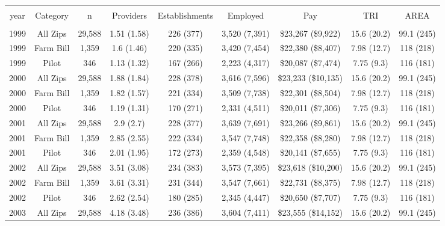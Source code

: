 
\begin{table}[!htbp] \centering 
  \caption{} 
  \label{} 
\begin{tabular}{@{\extracolsep{5pt}} ccccccccc} 
\\[-1.8ex]\hline 
\hline \\[-1.8ex] 
year & Category & n & Providers & Establishments & Employed & Pay & TRI & AREA \\ 
\hline \\[-1.8ex] 
1999 & All Zips & 29,588 & 1.51 (1.58) & 226 (377) & 3,520 (7,391) & \$23,267 (\$9,922) & 15.6 (20.2) & 99.1 (245) \\ 
1999 & Farm Bill & 1,359 & 1.6 (1.46) & 220 (335) & 3,420 (7,454) & \$22,380 (\$8,407) & 7.98 (12.7) & 118 (218) \\ 
1999 & Pilot & 346 & 1.13 (1.32) & 167 (266) & 2,223 (4,317) & \$20,087 (\$7,474) & 7.75 (9.3) & 116 (181) \\ 
2000 & All Zips & 29,588 & 1.88 (1.84) & 228 (378) & 3,616 (7,596) & \$23,233 (\$10,135) & 15.6 (20.2) & 99.1 (245) \\ 
2000 & Farm Bill & 1,359 & 1.82 (1.57) & 221 (334) & 3,509 (7,738) & \$22,301 (\$8,504) & 7.98 (12.7) & 118 (218) \\ 
2000 & Pilot & 346 & 1.19 (1.31) & 170 (271) & 2,331 (4,511) & \$20,011 (\$7,306) & 7.75 (9.3) & 116 (181) \\ 
2001 & All Zips & 29,588 & 2.9 (2.7) & 228 (377) & 3,639 (7,691) & \$23,266 (\$9,861) & 15.6 (20.2) & 99.1 (245) \\ 
2001 & Farm Bill & 1,359 & 2.85 (2.55) & 222 (334) & 3,547 (7,748) & \$22,358 (\$8,280) & 7.98 (12.7) & 118 (218) \\ 
2001 & Pilot & 346 & 2.01 (1.95) & 172 (273) & 2,359 (4,548) & \$20,141 (\$7,655) & 7.75 (9.3) & 116 (181) \\ 
2002 & All Zips & 29,588 & 3.51 (3.08) & 234 (383) & 3,573 (7,395) & \$23,618 (\$10,200) & 15.6 (20.2) & 99.1 (245) \\ 
2002 & Farm Bill & 1,359 & 3.61 (3.31) & 231 (344) & 3,547 (7,661) & \$22,731 (\$8,375) & 7.98 (12.7) & 118 (218) \\ 
2002 & Pilot & 346 & 2.62 (2.54) & 180 (285) & 2,345 (4,447) & \$20,650 (\$7,707) & 7.75 (9.3) & 116 (181) \\ 
2003 & All Zips & 29,588 & 4.18 (3.48) & 236 (386) & 3,604 (7,411) & \$23,555 (\$14,152) & 15.6 (20.2) & 99.1 (245) \\ 

\end{tabular}
\end{table}
